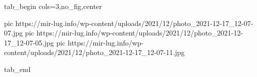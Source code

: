  
 
 
 
 


\ifcmt
  tab_begin cols=3,no_fig,center

     pic https://mir-lug.info/wp-content/uploads/2021/12/photo_2021-12-17_12-07-07.jpg
		 pic https://mir-lug.info/wp-content/uploads/2021/12/photo_2021-12-17_12-07-05.jpg
		 pic https://mir-lug.info/wp-content/uploads/2021/12/photo_2021-12-17_12-07-11.jpg

  tab_end
\fi
